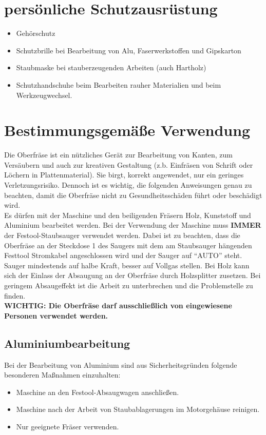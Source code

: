 \documentclass{\basedir/fablab-document}
\begin{document}
\section{persönliche Schutzausrüstung}

\begin{itemize}
\item Gehörschutz
\item Schutzbrille bei Bearbeitung von Alu, Faserwerkstoffen und Gipskarton
\item Staubmaske bei stauberzeugenden Arbeiten (auch Hartholz)
\item Schutzhandschuhe beim Bearbeiten rauher Materialien und beim Werkzeugwechsel.
\end{itemize}

\section{Bestimmungsgemäße Verwendung}
Die Oberfräse ist ein nützliches Gerät zur Bearbeitung von Kanten, zum Versäubern und auch zur kreativen Gestaltung (z.b. Einfräsen von Schrift oder Löchern in Plattenmaterial). Sie birgt, korrekt angewendet, nur ein geringes Verletzungsrisiko. Dennoch ist es wichtig, die folgenden Anweisungen genau zu beachten, damit die Oberfräse nicht zu Gesundheitsschäden führt oder beschädigt wird.\\
Es dürfen mit der Maschine und den beiligenden Fräsern Holz, Kunststoff und Aluminium bearbeitet werden. Bei der Verwendung der Maschine muss \textbf{IMMER} der Festool-Staubsauger verwendet werden. Dabei ist zu beachten, dass die Oberfräse an der Steckdose 1 des Saugers mit dem am Staubsauger hängenden Festtool Stromkabel angeschlossen wird und der Sauger auf \enquote{AUTO} steht. Sauger mindestends auf halbe Kraft, besser auf Vollgas stellen. Bei Holz kann sich der Einlass der Absaugung an der Oberfräse durch Holzsplitter zusetzen. Bei geringem Absaugeffekt ist die Arbeit zu unterbrechen und die Problemstelle zu finden.\\
\textbf{WICHTIG: Die Oberfräse darf ausschließlich von eingewiesene Personen verwendet werden.}


\subsection{Aluminiumbearbeitung}
Bei der Bearbeitung von Aluminium sind aus Sicherheitsgründen folgende besonderen Maßnahmen einzuhalten:
\begin{itemize}
\item Maschine an den Festool-Absaugwagen anschließen.
\item Maschine nach der Arbeit von Staubablagerungen im Motorgehäuse reinigen.
\item Nur geeignete Fräser verwenden.
\end{itemize}
\end{document}
